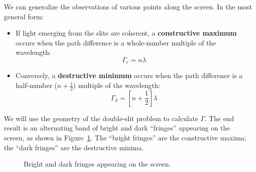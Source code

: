 We can generalize the observations of various points along the screen. In the
most general form:
\begin{itemize}
\item If light emerging from the slits are coherent, a
  \textbf{constructive maximum} occurs when the path difference is a
  whole-number multiple of the wavelength:
  \begin{equation}
    \boxed{
      \Gamma_c = n\lambda
    }
  \end{equation}
\item Conversely, a \textbf{destructive minimum} occurs when the path
  difference is a half-number ($n+\frac12$) multiple of the wavelength:
  \begin{equation}
    \boxed{
      \Gamma_d = \left[n+\frac12\right]\lambda
    }
  \end{equation}
\end{itemize}
We will use the geometry of the double-slit problem to calculate $\Gamma$. The
end result is an alternating band of bright and dark ``fringes'' appearing on
the screen, as shown in Figure~\ref{fig:fringes}. The ``bright fringes'' are
the constructive maxima; the ``dark fringes'' are the destructive minima.
\begin{figure}[ht]
  \centering
  \caption{Bright and dark fringes appearing on the screen.}
  \label{fig:fringes}
\end{figure}




